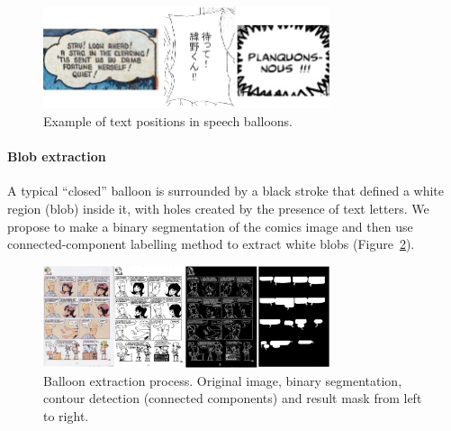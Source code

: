 	\begin{figure}[h!]	%
	  \centering
		\includegraphics[trim= 0px 0px 0px 0px, clip, width=0.75\textwidth]{text_in_balloon.png}
		\caption[Text positions in speech balloons]{Example of text positions in speech balloons.}
		\label{fig:se:text_in_balloon}
	\end{figure}

\paragraph{Blob extraction} %
\label{par:blob_extraction}

A typical ``closed'' balloon is surrounded by a black stroke that defined a white region (blob) inside it, with holes created by the presence of text letters.
We propose to make a binary segmentation of the comics image and then use connected-component labelling method to extract white blobs (Figure~\ref{fig:se:closed_balloon}).

	\begin{figure}[h!]	%
	  \centering
		\includegraphics[trim= 0px 0px 0px 0px, clip, width=0.75\textwidth]{closed_balloon_process.png}
		\caption[Sequential balloon extraction process illustration]{Balloon extraction process. Original image, binary segmentation, contour detection (connected components) and result mask from left to right.}
		\label{fig:se:closed_balloon}
	\end{figure}


